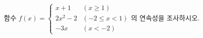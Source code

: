 함수 $f(x)=\begin{cases} x+1 & (x\ge 1) \\ 2x^2-2 & (-2\le x<1) \\ -3x & (x<-2) \end{cases}$의 연속성을 조사하시오.
